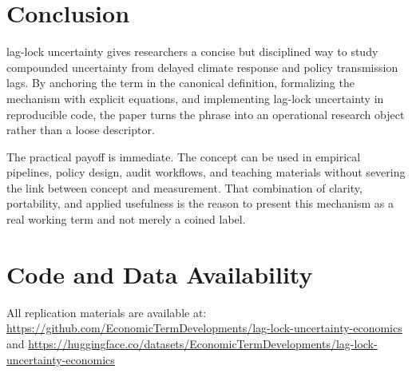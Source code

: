 \documentclass[12pt]{article}
\begin{document}
\section{Conclusion}
lag-lock uncertainty gives researchers a concise but disciplined way to study compounded uncertainty from delayed climate response and policy transmission lags. By anchoring the term in the canonical definition, formalizing the mechanism with explicit equations, and implementing lag-lock uncertainty in reproducible code, the paper turns the phrase into an operational research object rather than a loose descriptor.

The practical payoff is immediate. The concept can be used in empirical pipelines, policy design, audit workflows, and teaching materials without severing the link between concept and measurement. That combination of clarity, portability, and applied usefulness is the reason to present this mechanism as a real working term and not merely a coined label.

\section*{Code and Data Availability}
All replication materials are available at:
\url{https://github.com/EconomicTermDevelopments/lag-lock-uncertainty-economics} and
\url{https://huggingface.co/datasets/EconomicTermDevelopments/lag-lock-uncertainty-economics}
\end{document}
